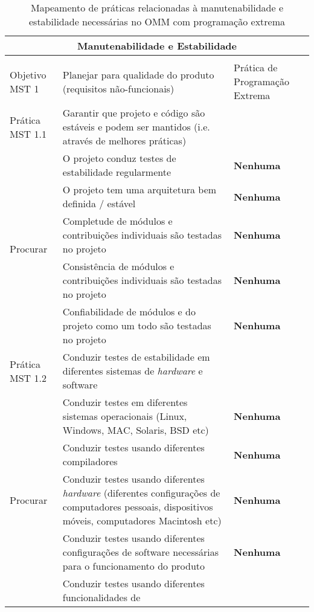 \begin{longtable}{|p{2cm}|p{7cm}|p{7cm}|}
  \caption{Mapeamento de práticas relacionadas à manutenabilidade e
    estabilidade necessárias no OMM com programação extrema} \\
  \multicolumn{3}{|c|}{\cellcolor[gray]{0.6} Manutenabilidade e
    Estabilidade}\\
  \endhead
  & & \\
  \hline \cellcolor[gray]{0.6} Objetivo MST 1 & \cellcolor[gray]{0.6}
  Planejar para qualidade do produto (requisitos não-funcionais) &
  Prática de Programação Extrema \\
  \hline \cellcolor[gray]{0.9} Prática MST 1.1 & \cellcolor[gray]{0.9}
  Garantir que projeto e código são estáveis e podem ser mantidos
  (i.e. através de melhores práticas) &
  \\
  \hline \multirow{5}{*}{Procurar} & O projeto conduz testes de
  estabilidade regularmente &\textbf{Nenhuma} \\
  \cline{2-3} & O projeto tem uma arquitetura bem definida / estável
  &\textbf{Nenhuma} \\
  \cline{2-3} & Completude de módulos e contribuições individuais são
  testadas no projeto &\textbf{Nenhuma} \\
  \cline{2-3} & Consistência de módulos e contribuições individuais
  são testadas no projeto &\textbf{Nenhuma} \\
  \cline{2-3} & Confiabilidade de módulos e do projeto como um todo
  são testadas no projeto &\textbf{Nenhuma} \\
  \hline \cellcolor[gray]{0.9} Prática MST 1.2 & \cellcolor[gray]{0.9}
  Conduzir testes de estabilidade em diferentes sistemas de
  \textit{hardware} e
  software & \\
  \hline \multirow{5}{*}{Procurar} & Conduzir testes em diferentes
  sistemas operacionais (Linux, Windows, MAC, Solaris, BSD etc) &
  \textbf{Nenhuma} \\
  \cline{2-3} & Conduzir testes usando diferentes compiladores
  &\textbf{Nenhuma} \\
  \cline{2-3} & Conduzir testes usando diferentes \textit{hardware}
  (diferentes configurações de computadores pessoais, dispositivos
  móveis, computadores Macintosh etc) &\textbf{Nenhuma} \\
  \cline{2-3} & Conduzir testes usando diferentes configurações de
  software necessárias para o funcionamento do produto
  &\textbf{Nenhuma} \\
  \cline{2-3} & Conduzir testes usando diferentes funcionalidades de

\end{longtable}
